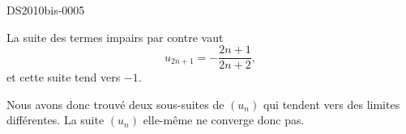 \begin{corrige}{DS2010bis-0005}
\begin{enumerate}
			La suite des termes impairs par contre vaut
			\begin{equation}
				u_{2n+1}=-\frac{ 2n+1 }{ 2n+2 },
			\end{equation}
			et cette suite tend vers $-1$.

			Nous avons donc trouvé deux sous-suites de $(u_n)$ qui tendent vers des limites différentes. La suite $(u_n)$ elle-même ne converge donc pas.
	\end{enumerate}

\end{corrige}
